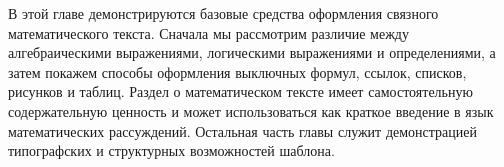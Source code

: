 В этой главе демонстрируются базовые средства оформления связного математического текста.
Сначала мы рассмотрим различие между алгебраическими выражениями, логическими выражениями и определениями, а затем покажем способы оформления выключных формул, ссылок, списков, рисунков и таблиц.
Раздел о математическом тексте имеет самостоятельную содержательную ценность и может использоваться как краткое введение в язык математических рассуждений.
Остальная часть главы служит демонстрацией типографских и структурных возможностей шаблона.
